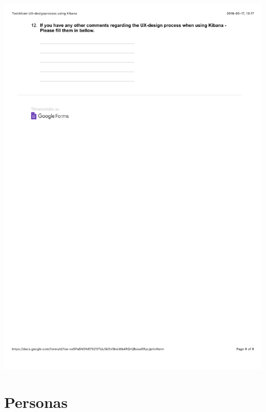 \documentclass[12pt]{kththesis}
\begin{document}
\begin{appendices}
\includegraphics[width=1\textwidth]{UX_designprocess9.pdf}

\section{Personas}

\end{appendices}
\end{document}
